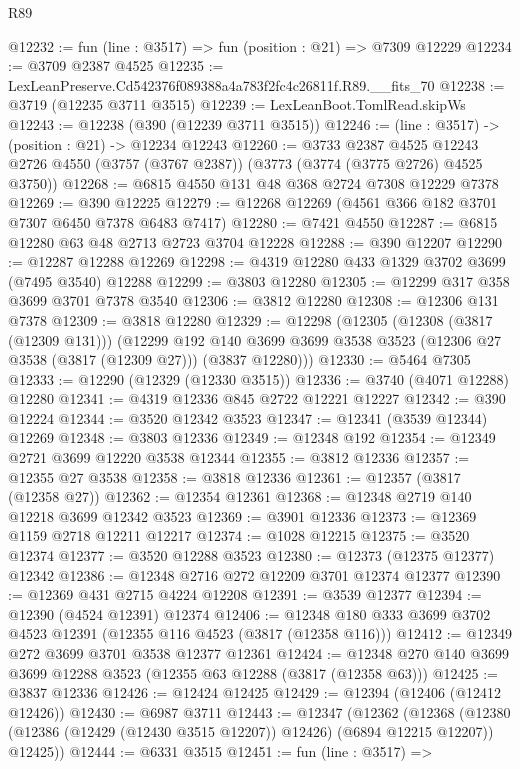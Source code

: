 \begin{lexlean}{R89}
\begin{coremodule}
@12232 := fun (line : @3517) => fun (position : @21) => @7309 @12229
@12234 := @3709 @2387 @4525
@12235 := LexLeanPreserve.Cd542376f089388a4a783f2fc4c26811f.R89.__fits_70
@12238 := @3719 (@12235 @3711 @3515)
@12239 := LexLeanBoot.TomlRead.skipWs
@12243 := @12238 (@390 (@12239 @3711 @3515))
@12246 := (line : @3517) -> (position : @21) -> @12234 @12243
@12260 := @3733
    @2387
    @4525
    @12243
    @2726
    @4550
    (@3757 (@3767 @2387))
    (@3773 (@3774 (@3775 @2726) @4525 @3750))
@12268 := @6815 @4550 @131 @48 @368 @2724 @7308 @12229 @7378
@12269 := @390 @12225
@12279 := @12268 @12269 (@4561 @366 @182 @3701 @7307 @6450 @7378 @6483 @7417)
@12280 := @7421 @4550
@12287 := @6815 @12280 @63 @48 @2713 @2723 @3704 @12228
@12288 := @390 @12207
@12290 := @12287 @12288 @12269
@12298 := @4319 @12280 @433 @1329 @3702 @3699 (@7495 @3540) @12288
@12299 := @3803 @12280
@12305 := @12299 @317 @358 @3699 @3701 @7378 @3540
@12306 := @3812 @12280
@12308 := @12306 @131 @7378
@12309 := @3818 @12280
@12329 := @12298
    (@12305
      (@12308 (@3817 (@12309 @131)))
      (@12299
        @192
        @140
        @3699
        @3699
        @3538
        @3523
        (@12306 @27 @3538 (@3817 (@12309 @27)))
        (@3837 @12280)))
@12330 := @5464 @7305
@12333 := @12290 (@12329 (@12330 @3515))
@12336 := @3740 (@4071 @12288) @12280
@12341 := @4319 @12336 @845 @2722 @12221 @12227
@12342 := @390 @12224
@12344 := @3520 @12342 @3523
@12347 := @12341 (@3539 @12344) @12269
@12348 := @3803 @12336
@12349 := @12348 @192
@12354 := @12349 @2721 @3699 @12220 @3538 @12344
@12355 := @3812 @12336
@12357 := @12355 @27 @3538
@12358 := @3818 @12336
@12361 := @12357 (@3817 (@12358 @27))
@12362 := @12354 @12361
@12368 := @12348 @2719 @140 @12218 @3699 @12342 @3523
@12369 := @3901 @12336
@12373 := @12369 @1159 @2718 @12211 @12217
@12374 := @1028 @12215
@12375 := @3520 @12374
@12377 := @3520 @12288 @3523
@12380 := @12373 (@12375 @12377) @12342
@12386 := @12348 @2716 @272 @12209 @3701 @12374 @12377
@12390 := @12369 @431 @2715 @4224 @12208
@12391 := @3539 @12377
@12394 := @12390 (@4524 @12391) @12374
@12406 := @12348 @180 @333 @3699 @3702 @4523 @12391 (@12355 @116 @4523 (@3817 (@12358 @116)))
@12412 := @12349 @272 @3699 @3701 @3538 @12377 @12361
@12424 := @12348 @270 @140 @3699 @3699 @12288 @3523 (@12355 @63 @12288 (@3817 (@12358 @63)))
@12425 := @3837 @12336
@12426 := @12424 @12425
@12429 := @12394 (@12406 (@12412 @12426))
@12430 := @6987 @3711
@12443 := @12347
    (@12362
      (@12368 (@12380 (@12386 (@12429 (@12430 @3515 @12207)) @12426) (@6894 @12215 @12207)) @12425))
@12444 := @6331 @3515
@12451 := fun (line : @3517) =>

\end{coremodule}
\end{lexlean}
